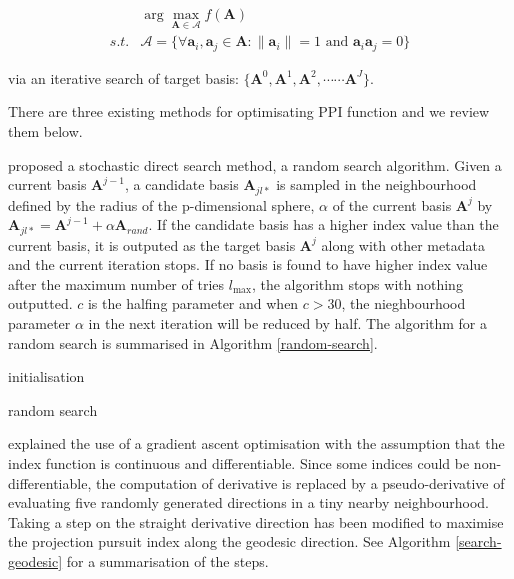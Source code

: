 \documentclass[12pt]{article}
\begin{document}
\begin{align}
&\arg \max_{\mathbf{A} \in \mathcal{A}} f(\mathbf{A}) \\
s.t. & \mathcal{A} = \{ \forall \mathbf{a}_i, \mathbf{a}_j \in \mathbf{A}: \lVert \mathbf{a}_i \rVert = 1 \text{ and } \mathbf{a}_i \mathbf{a}_j = 0 \}
\end{align}

via an iterative search of target basis:
\(\{\mathbf{A}^0, \mathbf{A}^1, \mathbf{A}^2, \cdots \cdots \mathbf{A}^J\}\).

There are three existing methods for optimisating PPI function and we
review them below.

\citet{posse1995projection} proposed a stochastic direct search method,
a random search algorithm. Given a current basis \(\mathbf{A}^{j-1}\), a
candidate basis \(\mathbf{A}_{jl*}\) is sampled in the neighbourhood
defined by the radius of the p-dimensional sphere, \(\alpha\) of the
current basis \(\mathbf{A}^{j}\) by
\(\mathbf{A}_{jl*} = \mathbf{A}^{j-1} + \alpha \mathbf{A}_{rand}\). If
the candidate basis has a higher index value than the current basis, it
is outputed as the target basis \(\mathbf{A}^{j}\) along with other
metadata and the current iteration stops. If no basis is found to have
higher index value after the maximum number of tries \(l_{\max}\), the
algorithm stops with nothing outputted. \(c\) is the halfing parameter
and when \(c > 30\), the nieghbourhood parameter \(\alpha\) in the next
iteration will be reduced by half. The algorithm for a random search is
summarised in Algorithm \ref{random-search}.

\begin{algorithm}
\SetAlgoLined
  initialisation\;
  \caption{random search}
  \label{random-search}
\end{algorithm}

\citet{cook1995grand} explained the use of a gradient ascent
optimisation with the assumption that the index function is continuous
and differentiable. Since some indices could be non-differentiable, the
computation of derivative is replaced by a pseudo-derivative of
evaluating five randomly generated directions in a tiny nearby
neighbourhood. Taking a step on the straight derivative direction has
been modified to maximise the projection pursuit index along the
geodesic direction. See Algorithm \ref{search-geodesic} for a
summarisation of the steps.
\end{document}
